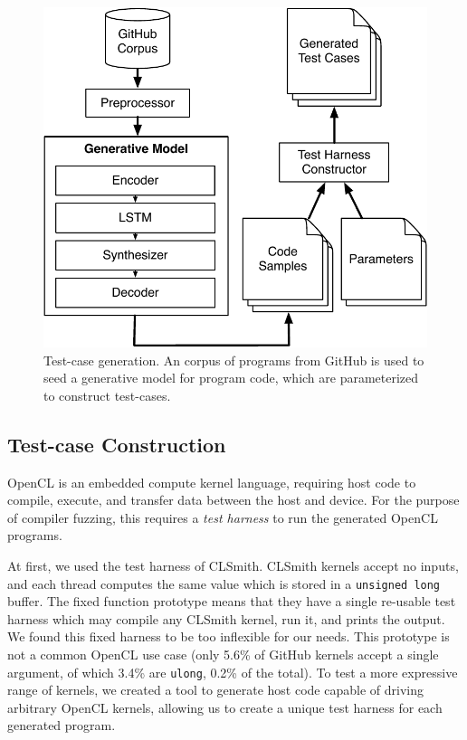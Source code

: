 \begin{figure}
  \centering
  \includegraphics[width=.80\columnwidth]{img/deepsmith} %
  \caption{%
    Test-case generation. An corpus of programs from GitHub is used to seed a generative model for program code, which are parameterized to construct test-cases.%
  }%
  \label{fig:deeptune}
\end{figure}


\subsection{Test-case Construction}

OpenCL is an embedded compute kernel language, requiring host code to compile, execute, and transfer data between the host and device. For the purpose of compiler fuzzing, this requires a \emph{test harness} to run the generated OpenCL programs.

At first, we used the test harness of CLSmith. CLSmith kernels accept no inputs, and each thread computes the same value which is stored in a \texttt{unsigned long} buffer. The fixed function prototype means that they have a single re-usable test harness which may compile any CLSmith kernel, run it, and prints the output. We found this fixed harness to be too inflexible for our needs. This prototype is not a common OpenCL use case (only 5.6\% of GitHub kernels accept a single argument, of which 3.4\% are \texttt{ulong}, 0.2\% of the total).
To test a more expressive range of kernels, we created a tool to generate host code capable of driving arbitrary OpenCL kernels, allowing us to create a unique test harness for each generated program.


